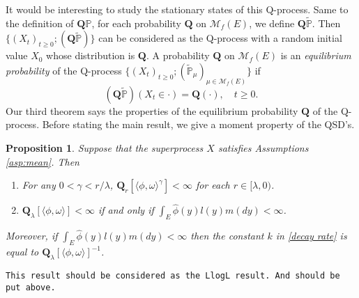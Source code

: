 \documentclass[12pt,a4paper]{amsart}
\numberwithin{equation}{section}
\theoremstyle{plain}
\newtheorem{prop}[thm]{Proposition}
\theoremstyle{definition}
\theoremstyle{remark}
\begin{document}
{It would be interesting to study the stationary states of this Q-process.  Same to the definition of $\mathbf Q\mathbb P$, for each probability $\mathbf Q$ on $\mathcal M_f(E)$, we define $\mathbf Q\widetilde{\mathbb P}$.  Then $\{(X_t)_{t\geq 0}; (\mathbf Q\widetilde{\mathbb P})\}$ can be considered as the Q-process with a random initial value $X_0$ whose distribution is $\mathbf Q$.  A probability $\mathbf Q$ on $\mathcal M_f(E)$ is an \emph{equilibrium probability} of the Q-process $\{(X_t)_{t\geq 0}; (\widetilde{\mathbb P}_\mu)_{\mu\in\mathcal M_f(E)}\}$ if
\[
	(\mathbf Q\widetilde{\mathbb P})(X_t \in \cdot ) =\mathbf Q(\cdot),	\quad t\geq 0.
\]
Our third theorem says the properties of the equilibrium probability $\mathbf Q$ of the Q-process.  Before stating the main result, we give a moment property of the QSD's.
\begin{prop}\label{prop: exp prop}
	Suppose that the superprocess $X$ satisfies Assumptions \ref{asp:mean}.  Then
\begin{enumerate}
\item  For any $0<\gamma<r/\lambda$,
	$\mathbf Q_r[\langle\phi,\omega\rangle^\gamma]<\infty$ for each $r \in [\lambda, 0)$.
\item
	$\mathbf Q_\lambda[\langle\phi,\omega\rangle] < \infty$ if and only if $\int_E \widehat\phi(y)l(y)m(dy)<\infty$.
\end{enumerate}
	Moreover, if $\int_E \widehat\phi(y)l(y)m(dy)<\infty$ then the constant $k$ in \eqref{decay rate} is equal to $\mathbf Q_\lambda[\langle\phi,\omega\rangle]^{-1}$.
\end{prop}

{\tt This result should be considered as the LlogL result. And should be put above.}

}
\end{document}
